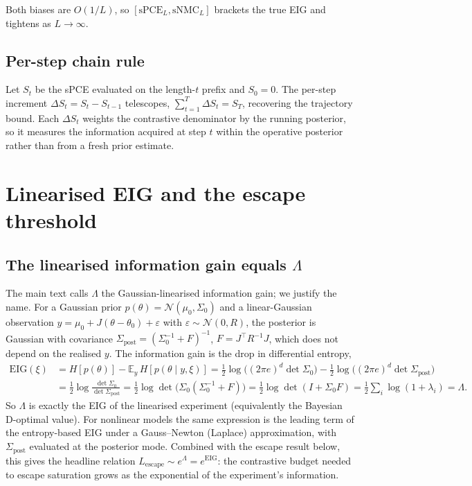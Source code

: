 Both biases are $O(1/L)$, so $[\mathrm{sPCE}_L,\mathrm{sNMC}_L]$ brackets the true
EIG and tightens as $L\to\infty$.

\section{Per-step chain rule}
\label{app:chain}

Let $S_t$ be the sPCE evaluated on the length-$t$ prefix and $S_0=0$. The per-step
increment $\Delta S_t=S_t-S_{t-1}$ telescopes, $\sum_{t=1}^{T}\Delta S_t=S_T$,
recovering the trajectory bound. Each $\Delta S_t$ weights the contrastive
denominator by the running posterior, so it measures the information acquired at
step $t$ within the operative posterior rather than from a fresh prior estimate.

\chapter{Linearised EIG and the escape threshold}
\label{app:lindley}

\section{The linearised information gain equals $\Lambda$}
The main text calls $\Lambda$ the Gaussian-linearised information gain; we justify the
name. For a Gaussian prior $p(\theta)=\mathcal N(\mu_0,\Sigma_0)$ and a linear-Gaussian
observation $y=\mu_0+J(\theta-\theta_0)+\varepsilon$ with $\varepsilon\sim\mathcal N(0,R)$,
the posterior is Gaussian with covariance $\Sigma_{\mathrm{post}}=(\Sigma_0^{-1}+F)^{-1}$,
$F=J^\top R^{-1}J$, which does not depend on the realised $y$. The information gain is the
drop in differential entropy,
\begin{align}
\mathrm{EIG}(\xi)
&= H[p(\theta)]-\mathbb{E}_y\,H[p(\theta\mid y,\xi)]
= \tfrac12\log\!\big((2\pi e)^d\det\Sigma_0\big)-\tfrac12\log\!\big((2\pi e)^d\det\Sigma_{\mathrm{post}}\big)\nonumber\\
&= \tfrac12\log\frac{\det\Sigma_0}{\det\Sigma_{\mathrm{post}}}
= \tfrac12\log\det\!\big(\Sigma_0(\Sigma_0^{-1}+F)\big)
= \tfrac12\log\det(I+\Sigma_0 F)
= \tfrac12\sum_i\log(1+\lambda_i)=\Lambda. \label{eq:eig-lambda}
\end{align}
So $\Lambda$ is exactly the EIG of the linearised experiment (equivalently the Bayesian
D-optimal value). For nonlinear models the same expression is the leading term of the
entropy-based EIG under a Gauss--Newton (Laplace) approximation, with $\Sigma_{\mathrm{post}}$
evaluated at the posterior mode. Combined with the escape result below, this gives the
headline relation $L_{\mathrm{escape}}\sim e^{\Lambda}=e^{\mathrm{EIG}}$: the contrastive
budget needed to escape saturation grows as the exponential of the experiment's
information.

